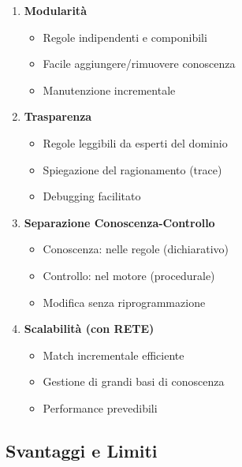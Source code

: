 \begin{enumerate}
\item \textbf{Modularità}
\begin{itemize}
\item Regole indipendenti e componibili
\item Facile aggiungere/rimuovere conoscenza
\item Manutenzione incrementale
\end{itemize}

\item \textbf{Trasparenza}
\begin{itemize}
\item Regole leggibili da esperti del dominio
\item Spiegazione del ragionamento (trace)
\item Debugging facilitato
\end{itemize}

\item \textbf{Separazione Conoscenza-Controllo}
\begin{itemize}
\item Conoscenza: nelle regole (dichiarativo)
\item Controllo: nel motore (procedurale)
\item Modifica senza riprogrammazione
\end{itemize}

\item \textbf{Scalabilità (con RETE)}
\begin{itemize}
\item Match incrementale efficiente
\item Gestione di grandi basi di conoscenza
\item Performance prevedibili
\end{itemize}
\end{enumerate}

\subsection{Svantaggi e Limiti}

